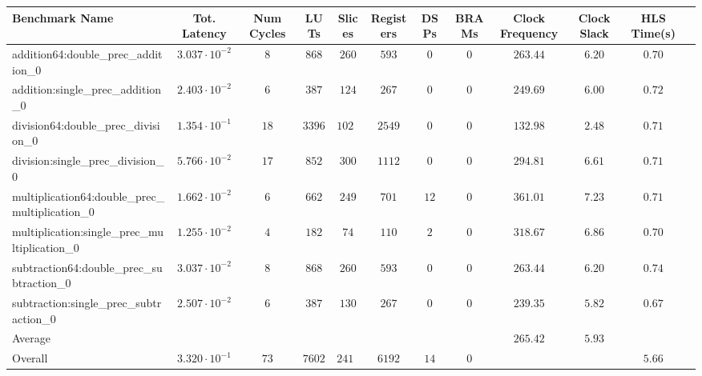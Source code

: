 \begin{tabular}{|l|c|c|c|c|c|c|c|c|c|c|c|}
\hline
Benchmark Name                                   & Tot. Latency            & Num Cycles & LUTs     & Slices   & Registers & DSPs   & BRAMs & Clock Frequency & Clock Slack & HLS Time(s) \\
\hline
addition64:double\_prec\_addition\_0             & $ 3.037 \cdot 10^{-2} $ & $ 8      $ & $ 868  $ & $ 260  $ & $ 593   $ & $ 0  $ & $ 0 $ & $ 263.44      $ & $ 6.20    $ & $ 0.70    $ \\
addition:single\_prec\_addition\_0               & $ 2.403 \cdot 10^{-2} $ & $ 6      $ & $ 387  $ & $ 124  $ & $ 267   $ & $ 0  $ & $ 0 $ & $ 249.69      $ & $ 6.00    $ & $ 0.72    $ \\
division64:double\_prec\_division\_0             & $ 1.354 \cdot 10^{-1} $ & $ 18     $ & $ 3396 $ & $ 1020 $ & $ 2549  $ & $ 0  $ & $ 0 $ & $ 132.98      $ & $ 2.48    $ & $ 0.71    $ \\
division:single\_prec\_division\_0               & $ 5.766 \cdot 10^{-2} $ & $ 17     $ & $ 852  $ & $ 300  $ & $ 1112  $ & $ 0  $ & $ 0 $ & $ 294.81      $ & $ 6.61    $ & $ 0.71    $ \\
multiplication64:double\_prec\_multiplication\_0 & $ 1.662 \cdot 10^{-2} $ & $ 6      $ & $ 662  $ & $ 249  $ & $ 701   $ & $ 12 $ & $ 0 $ & $ 361.01      $ & $ 7.23    $ & $ 0.71    $ \\
multiplication:single\_prec\_multiplication\_0   & $ 1.255 \cdot 10^{-2} $ & $ 4      $ & $ 182  $ & $ 74   $ & $ 110   $ & $ 2  $ & $ 0 $ & $ 318.67      $ & $ 6.86    $ & $ 0.70    $ \\
subtraction64:double\_prec\_subtraction\_0       & $ 3.037 \cdot 10^{-2} $ & $ 8      $ & $ 868  $ & $ 260  $ & $ 593   $ & $ 0  $ & $ 0 $ & $ 263.44      $ & $ 6.20    $ & $ 0.74    $ \\
subtraction:single\_prec\_subtraction\_0         & $ 2.507 \cdot 10^{-2} $ & $ 6      $ & $ 387  $ & $ 130  $ & $ 267   $ & $ 0  $ & $ 0 $ & $ 239.35      $ & $ 5.82    $ & $ 0.67    $ \\
\hline
Average                                          & $                     $ & $        $ & $      $ & $      $ & $       $ & $    $ & $   $ & $ 265.42      $ & $ 5.93    $ & $         $ \\
\hline
Overall                                          & $ 3.320 \cdot 10^{-1} $ & $ 73     $ & $ 7602 $ & $ 2417 $ & $ 6192  $ & $ 14 $ & $ 0 $ & $             $ & $         $ & $ 5.66    $ \\
\hline
\end{tabular}
